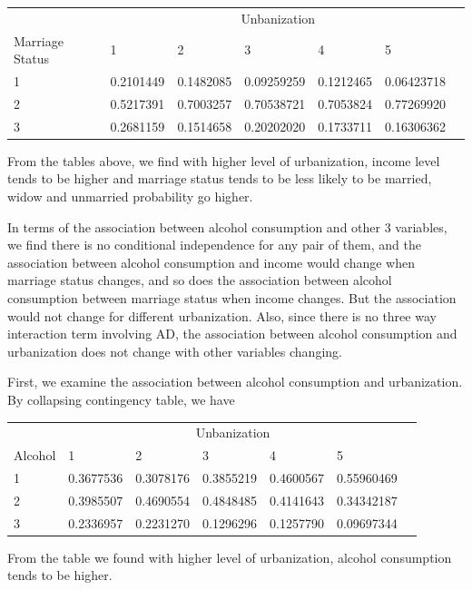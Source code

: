 \documentclass{article}
\begin{document}
        \begin{center}
    	\begin{tabular}{lllllll}
    	\toprule
    	& \multicolumn{5}{c}{Unbanization}\\
Marriage Status &     1        &  2       &  3       &   4         &5\\
\midrule
1 &0.2101449 &0.1482085 &0.09259259 &0.1212465 &0.06423718\\
2 &0.5217391 &0.7003257 &0.70538721 &0.7053824 &0.77269920\\
3 &0.2681159 &0.1514658 &0.20202020 &0.1733711 &0.16306362\\
    	\bottomrule
    	\end{tabular}
    \end{center}

    From the tables above, we find with higher level of urbanization, income level tends to be higher and marriage status tends to be less likely to be married, widow and unmarried probability go higher.

    In terms of the association between alcohol consumption and other 3 variables, we find there is no conditional independence for any pair of them, and the association between alcohol consumption and income would change when marriage status changes, and so does the association between alcohol consumption between marriage status when income changes. But the association would not change for different urbanization. Also, since there is no three way interaction term involving AD, the association between alcohol consumption and urbanization does not change with other variables changing.

    First, we examine the association between alcohol consumption and urbanization. By collapsing contingency table, we have
        \begin{center}
    	\begin{tabular}{lllllll}
    	\toprule
    	& \multicolumn{5}{c}{Unbanization}\\
Alcohol &     1        &  2       &  3       &   4         &5\\
\midrule
1& 0.3677536 &0.3078176 &0.3855219 &0.4600567 &0.55960469\\
2& 0.3985507 &0.4690554 &0.4848485 &0.4141643 &0.34342187\\
3& 0.2336957 &0.2231270 &0.1296296 &0.1257790 &0.09697344\\
    	\bottomrule
    	\end{tabular}
    \end{center}
    From the table we found with higher level of urbanization, alcohol consumption tends to be higher.
\end{document}
